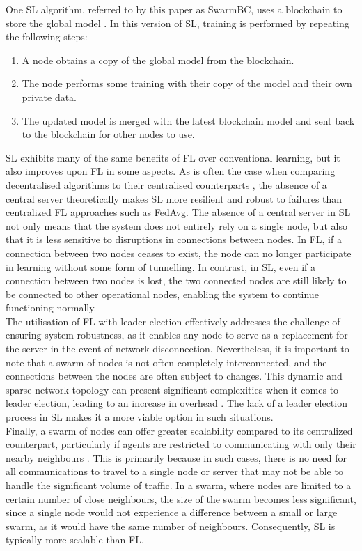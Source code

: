 \documentclass[letterpaper, 10 pt, conference]{ieeeconf}  %
\begin{document}
One SL algorithm, referred to by this paper as SwarmBC, uses a blockchain to store the global model \cite{swarm_learning}. In this version of SL, training is performed by repeating the following steps:
\begin{enumerate}
	\item A node obtains a copy of the global model from the blockchain.
	\item The node performs some training with their copy of the model and their own private data.
	\item The updated model is merged with the latest blockchain model and sent back to the blockchain for other nodes to use.
\end{enumerate}

SL exhibits many of the same benefits of FL over conventional learning, but it also improves upon FL in some aspects. As is often the case when comparing decentralised algorithms to their centralised counterparts \cite{swarm_resil}, the absence of a central server theoretically makes SL more resilient and robust to failures than centralized FL approaches such as FedAvg. The absence of a central server in SL not only means that the system does not entirely rely on a single node, but also that it is less sensitive to disruptions in connections between nodes. In FL, if a connection between two nodes ceases to exist, the node can no longer participate in learning without some form of tunnelling. In contrast, in SL, even if a connection between two nodes is lost, the two connected nodes are still likely to be connected to other operational nodes, enabling the system to continue functioning normally. \\

The utilisation of FL with leader election effectively addresses the challenge of ensuring system robustness, as it enables any node to serve as a replacement for the server in the event of network disconnection. Nevertheless, it is important to note that a swarm of nodes is not often completely interconnected, and the connections between the nodes are often subject to changes. This dynamic and sparse network topology can present significant complexities when it comes to leader election, leading to an increase in overhead \cite{leaderelection}. The lack of a leader election process in SL makes it a more viable option in such situations. \\

Finally, a swarm of nodes can offer greater scalability compared to its centralized counterpart, particularly if agents are restricted to communicating with only their nearby neighbours \cite{swarmscalable}. This is primarily because in such cases, there is no need for all communications to travel to a single node or server that may not be able to handle the significant volume of traffic. In a swarm, where nodes are limited to a certain number of close neighbours, the size of the swarm becomes less significant, since a single node would not experience a difference between a small or large swarm, as it would have the same number of neighbours. Consequently, SL is typically more scalable than FL.
\end{document}
